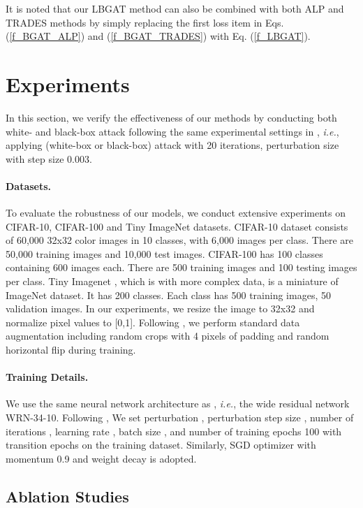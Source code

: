 \documentclass[10pt,twocolumn,letterpaper]{article}
\begin{document}
It is noted that our LBGAT method can also be combined with both ALP and TRADES methods by simply replacing the first loss item in Eqs. (\ref{f_BGAT_ALP}) and (\ref{f_BGAT_TRADES}) with Eq. (\ref{f_LBGAT}).

\section{Experiments}
\label{exp_evaluation}
In this section, we verify the effectiveness of our methods by conducting both white- and black-box attack following the same experimental settings in \cite{zhang2019theoretically}, {\it i.e.}, applying  (white-box or black-box) attack with 20 iterations, perturbation size   with step size 0.003.

\paragraph{Datasets.}
To evaluate the robustness of our models, we conduct extensive experiments on CIFAR-10, CIFAR-100 and Tiny ImageNet datasets. CIFAR-10 dataset consists of 60,000 32x32 color images in 10 classes, with 6,000 images per class. There are 50,000 training images and 10,000 test images. 
CIFAR-100 has 100 classes containing 600 images each. There are 500 training images and 100 testing images per class. 
Tiny Imagenet \cite{DBLP:conf/cvpr/DengDSLL009}, which is with more complex data, is a miniature of ImageNet dataset. It has 200 classes. Each class has 500 training images, 50 validation images. In our experiments, we resize the image to 32x32 and normalize pixel values to [0,1].
Following \cite{zhang2019theoretically}, we perform standard data augmentation including random crops with 4 pixels of padding and random horizontal flip during training.

\paragraph{Training Details.}
We use the same neural network architecture as \cite{zhang2019theoretically}, {\it i.e.}, the wide residual network WRN-34-10. Following \cite{zhang2019theoretically}, We set perturbation , perturbation step size , number of iterations , learning rate , batch size , and number of training epochs 100 with transition epochs  on the training dataset. Similarly, SGD optimizer with momentum 0.9 and weight decay  is adopted.

\subsection{Ablation Studies}
\end{document}
